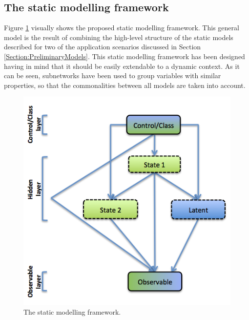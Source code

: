 
\subsection{The static modelling framework}\label{StaticFramework}

Figure \ref{Figure:StaticModellingFramework} visually shows the proposed static modelling framework. This general model
is the result of combining the high-level structure of the static models described for two of the application scenarios discussed in Section \ref{Section:PreliminaryModels}. This static modelling framework has been designed having in mind that it should be easily extendable to a dynamic context. As it can be seen, subnetworks have been used to group variables with similar properties, so that the commonalities between all models are taken into account. 

\begin{figure}[ht!]
\begin{center}
\includegraphics[scale=0.4]{./figures/StaticModellingFramework}
\caption{\label{Figure:StaticModellingFramework} The static modelling framework.}
\end{center}
\end{figure}


